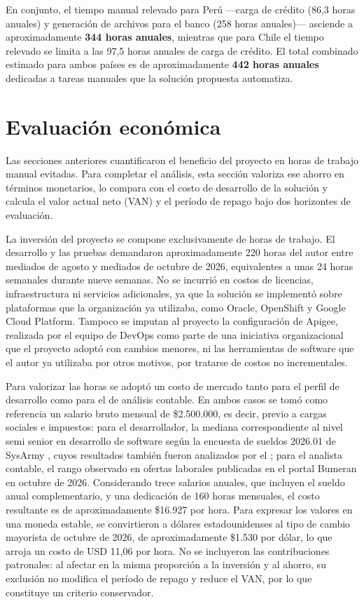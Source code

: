 En conjunto, el tiempo manual relevado para Perú ---carga de crédito (86,3 horas anuales) y generación de archivos para el banco (258 horas anuales)--- asciende a aproximadamente \textbf{344 horas anuales}, mientras que para Chile el tiempo relevado se limita a las 97,5 horas anuales de carga de crédito. El total combinado estimado para ambos países es de aproximadamente \textbf{442 horas anuales} dedicadas a tareas manuales que la solución propuesta automatiza.

\section{Evaluación económica}

Las secciones anteriores cuantificaron el beneficio del proyecto en horas de trabajo manual evitadas. Para completar el análisis, esta sección valoriza ese ahorro en términos monetarios, lo compara con el costo de desarrollo de la solución y calcula el valor actual neto (VAN) y el período de repago bajo dos horizontes de evaluación.

La inversión del proyecto se compone exclusivamente de horas de trabajo. El desarrollo y las pruebas demandaron aproximadamente 220 horas del autor entre mediados de agosto y mediados de octubre de 2026, equivalentes a unas 24 horas semanales durante nueve semanas. No se incurrió en costos de licencias, infraestructura ni servicios adicionales, ya que la solución se implementó sobre plataformas que la organización ya utilizaba, como Oracle, OpenShift y Google Cloud Platform. Tampoco se imputan al proyecto la configuración de Apigee, realizada por el equipo de DevOps como parte de una iniciativa organizacional que el proyecto adoptó con cambios menores, ni las herramientas de software que el autor ya utilizaba por otros motivos, por tratarse de costos no incrementales.

Para valorizar las horas se adoptó un costo de mercado tanto para el perfil de desarrollo como para el de análisis contable. En ambos casos se tomó como referencia un salario bruto mensual de \$2.500.000, es decir, previo a cargas sociales e impuestos: para el desarrollador, la mediana correspondiente al nivel semi senior en desarrollo de software según la encuesta de sueldos 2026.01 de SysArmy \citep{openqube2026}, cuyos resultados también fueron analizados por el \citet{dcuba2026}; para el analista contable, el rango observado en ofertas laborales publicadas en el portal Bumeran en octubre de 2026. Considerando trece salarios anuales, que incluyen el sueldo anual complementario, y una dedicación de 160 horas mensuales, el costo resultante es de aproximadamente \$16.927 por hora. Para expresar los valores en una moneda estable, se convirtieron a dólares estadounidenses al tipo de cambio mayorista de octubre de 2026, de aproximadamente \$1.530 por dólar, lo que arroja un costo de USD 11,06 por hora. No se incluyeron las contribuciones patronales: al afectar en la misma proporción a la inversión y al ahorro, su exclusión no modifica el período de repago y reduce el VAN, por lo que constituye un criterio conservador.

